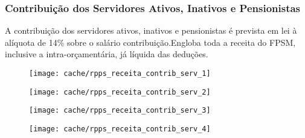 
\subsubsection[Contribuição dos Servidores]{Contribuição dos Servidores Ativos, Inativos e Pensionistas}

A contribuição dos servidores ativos, inativos e pensionistas é prevista em lei à alíquota de 14\% sobre o salário contribuição.Engloba toda a receita do FPSM, inclusive a intra-orçamentária, já líquida das deduções.





\begin{figure}[H]
\center
\texttt{[image: cache/rpps\_receita\_contrib\_serv\_1]}
\end{figure}

\begin{figure}[H]
\center
\texttt{[image: cache/rpps\_receita\_contrib\_serv\_2]}
\end{figure}

\begin{figure}[H]
\center
\texttt{[image: cache/rpps\_receita\_contrib\_serv\_3]}
\end{figure}

\begin{figure}[H]
\center
\texttt{[image: cache/rpps\_receita\_contrib\_serv\_4]}
\end{figure}